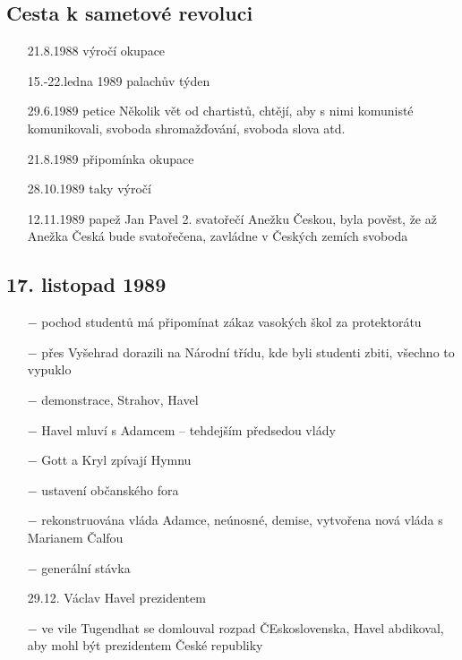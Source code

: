 \documentclass{article}
\begin{document}
\subsection*{Cesta k sametové revoluci}
\begin{itemize}
    \vspace{-0.5em}
    \setlength\itemsep{0.15em}
    \item[21.8.1988] výročí okupace
    \item[15.-22.ledna 1989] palachův týden
    \item[29.6.1989] petice Několik vět od chartistů, chtějí, aby s nimi komunisté komunikovali, svoboda shromažďování, svoboda slova atd.
    \item[21.8.1989] připomínka okupace
    \item[28.10.1989] taky výročí
    \item[12.11.1989] papež Jan Pavel 2. svatořečí Anežku Českou, byla pověst, že až Anežka Česká bude svatořečena, zavládne v Českých zemích svoboda
\end{itemize}

\subsection*{17. listopad 1989}
\begin{itemize}
    \vspace{-0.5em}
    \setlength\itemsep{0.15em}
    \item[$-$] pochod studentů má připomínat zákaz vasokých škol za protektorátu
    \item[$-$] přes Vyšehrad dorazili na Národní třídu, kde byli studenti zbiti, všechno to vypuklo
    \item[$-$] demonstrace, Strahov, Havel
    \item[$-$] Havel mluví s Adamcem -- tehdejším předsedou vlády
    \item[$-$] Gott a Kryl zpívají Hymnu
    \item[$-$]  ustavení občanského fora
    \item[$-$] rekonstruována vláda Adamce, neúnosné, demise, vytvořena nová vláda s Marianem Čalfou
    \item[$-$] generální stávka
    \item[29.12.] Václav Havel prezidentem
    \item[$-$] ve vile Tugendhat se domlouval rozpad ČEskoslovenska, Havel abdikoval, aby mohl být prezidentem České republiky
\end{itemize}
\end{document}
